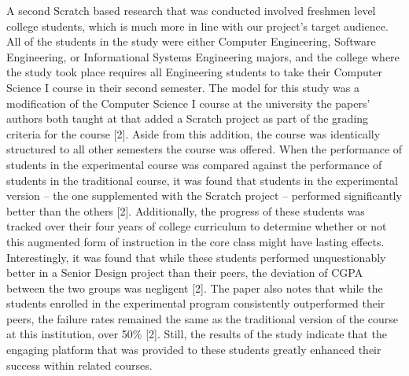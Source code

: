 A second Scratch based research that was conducted involved freshmen level college 
students, which is much more in line with our project's target audience. All of the 
students in the study were either Computer Engineering, Software Engineering, or 
Informational Systems Engineering majors, and the college where the study took place requires 
all Engineering students to take their Computer Science I course in their second semester. The model 
for this study was a modification of the Computer Science I course at the university 
the papers' authors both taught at that added a Scratch project as part of the grading 
criteria for the course [2]. Aside from this addition, the course was identically structured 
to all other semesters the course was offered. When the performance of students in 
the experimental course was compared against the performance of students in the 
traditional course, it was found that students in the experimental version -- the one 
supplemented with the Scratch project -- performed significantly better than the 
others [2]. Additionally, the progress of these students was tracked over their four 
years of college curriculum to determine whether or not this augmented form of 
instruction in the core class might have lasting effects. Interestingly, it was found that 
while these students performed unquestionably better in a Senior Design project than 
their peers, the deviation of CGPA between the two groups was negligent [2]. The 
paper also notes that while the students enrolled in the experimental program consistently
outperformed their peers, the failure rates remained the same as the traditional version of 
the course at this institution, over 50\% [2]. Still, the results of the study indicate that the
engaging platform that was provided to these students greatly enhanced their success within
related courses.\\

